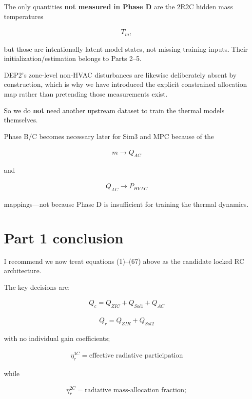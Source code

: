 \documentclass[11pt]{article}
\begin{document}
The only quantities \textbf{not measured in Phase D} are the 2R2C hidden mass temperatures

\begin{align}
T_m,
\end{align}

but those are intentionally latent model states, not missing training inputs. Their initialization/estimation belongs to Parts 2--5.

DEP2's zone-level non-HVAC disturbances are likewise deliberately absent by construction, which is why we have introduced the explicit constrained allocation map rather than pretending those measurements exist.

So we do \textbf{not} need another upstream dataset to train the thermal models themselves.

Phase B/C becomes necessary later for Sim3 and MPC because of the

\begin{align}
\dot m\rightarrow Q_{AC}
\end{align}

and

\begin{align}
Q_{AC}\rightarrow P_{HVAC}
\end{align}

mappings---not because Phase D is insufficient for training the thermal dynamics.

\section*{Part 1 conclusion}

I recommend we now treat equations (1)--(67) above as the candidate locked RC architecture.

The key decisions are:

\begin{align}
\boxed{
Q_c=Q_{ZIC}+Q_{Sol1}+Q_{AC}
}
\end{align}

\begin{align}
\boxed{
Q_r=Q_{ZIR}+Q_{Sol2}
}
\end{align}

with no individual gain coefficients;

\begin{align}
\boxed{
\eta_r^{1C}
=
\text{effective radiative participation}
}
\end{align}

while

\begin{align}
\boxed{
\eta_r^{2C}
=
\text{radiative mass-allocation fraction};
}
\end{align}
\end{document}
